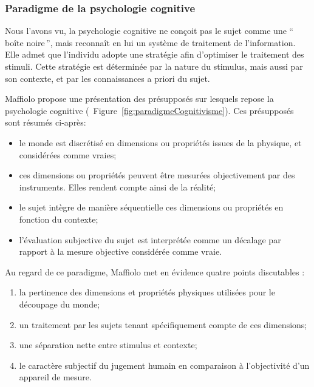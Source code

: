 \subsubsection{Paradigme de la psychologie cognitive}
\label{sec:ch3_psychoCog}

Nous l'avons vu, la psychologie cognitive ne conçoit pas le sujet comme une ``\,boîte noire\,'', mais reconnaît en lui un système de traitement de l'information. Elle admet que l'individu adopte une stratégie afin d'optimiser le traitement des stimuli. Cette stratégie est déterminée par la nature du stimulus, mais aussi par son contexte, et par les connaissances a priori du sujet.

Maffiolo \citep[p. ??]{maffiolo_caracterisation_1999} propose une présentation des présupposés sur lesquels repose la psychologie cognitive (\cf~Figure~\ref{fig:paradigmeCognitivisme}). Ces présupposés sont résumés ci-après:

\begin{itemize}
\item le monde est discrétisé en dimensions ou propriétés issues de la physique, et considérées comme vraies;
\item ces dimensions ou propriétés peuvent être mesurées objectivement par des instruments. Elles rendent compte ainsi de la réalité;
\item le sujet intègre de manière séquentielle ces dimensions ou propriétés en fonction du contexte;
\item l'évaluation subjective du sujet est interprétée comme un décalage par rapport à la mesure objective considérée comme vraie.
\end{itemize}


Au regard de ce paradigme, Maffiolo met en évidence quatre points discutables :

\begin{enumerate}
\item la pertinence des dimensions et propriétés physiques utilisées pour le découpage du monde; 
\item un traitement par les sujets tenant spécifiquement compte de ces dimensions;
\item une séparation nette entre stimulus et contexte;
\item le caractère subjectif du jugement humain en comparaison à l'objectivité d'un appareil de mesure.
\end{enumerate}

